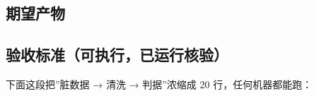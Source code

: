 \subsection{期望产物}\label{ux671fux671bux4ea7ux7269}

\begin{Shaded}
\begin{Highlighting}[]
\end{Highlighting}
\end{Shaded}

\subsection{验收标准（可执行，已运行核验）}\label{ux9a8cux6536ux6807ux51c6ux53efux6267ux884cux5df2ux8fd0ux884cux6838ux9a8c-1}

下面这段把''脏数据 → 清洗 → 判据''浓缩成 20 行，任何机器都能跑：

